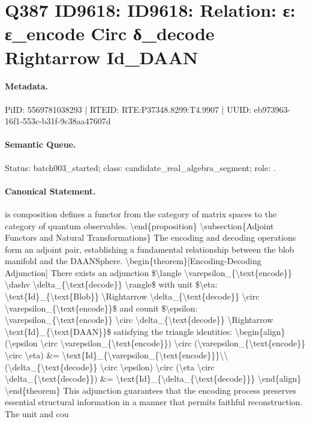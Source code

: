 \section*{Q387 ID9618: ID9618: Relation: ε: ε\_encode Circ δ\_decode Rightarrow Id\_DAAN}
\paragraph{Metadata.}
PiID: 5569781038293 | RTEID: RTE:P37348.8299:T4.9907 | UUID: eb973963-16f1-553c-b31f-9c38aa47607d

\paragraph{Semantic Queue.}
Status: batch003\_started; class: candidate\_real\_algebra\_segment; role: .

\paragraph{Canonical Statement.}
is composition defines a functor from the category of matrix spaces to the category of quantum observables. \textbackslash{}end\{proposition\} \textbackslash{}subsection\{Adjoint Functors and Natural Transformations\} The encoding and decoding operations form an adjoint pair, establishing a fundamental relationship between the blob manifold and the DAANSphere. \textbackslash{}begin\{theorem\}[Encoding-Decoding Adjunction] There exists an adjunction \$\textbackslash{}langle \textbackslash{}varepsilon\_\{\textbackslash{}text\{encode\}\} \textbackslash{}dashv \textbackslash{}delta\_\{\textbackslash{}text\{decode\}\} \textbackslash{}rangle\$ with unit \$\textbackslash{}eta: \textbackslash{}text\{Id\}\_\{\textbackslash{}text\{Blob\}\} \textbackslash{}Rightarrow \textbackslash{}delta\_\{\textbackslash{}text\{decode\}\} \textbackslash{}circ \textbackslash{}varepsilon\_\{\textbackslash{}text\{encode\}\}\$ and counit \$\textbackslash{}epsilon: \textbackslash{}varepsilon\_\{\textbackslash{}text\{encode\}\} \textbackslash{}circ \textbackslash{}delta\_\{\textbackslash{}text\{decode\}\} \textbackslash{}Rightarrow \textbackslash{}text\{Id\}\_\{\textbackslash{}text\{DAAN\}\}\$ satisfying the triangle identities: \textbackslash{}begin\{align\} (\textbackslash{}epsilon \textbackslash{}circ \textbackslash{}varepsilon\_\{\textbackslash{}text\{encode\}\}) \textbackslash{}circ (\textbackslash{}varepsilon\_\{\textbackslash{}text\{encode\}\} \textbackslash{}circ \textbackslash{}eta) \&= \textbackslash{}text\{Id\}\_\{\textbackslash{}varepsilon\_\{\textbackslash{}text\{encode\}\}\}\textbackslash{}\textbackslash{} (\textbackslash{}delta\_\{\textbackslash{}text\{decode\}\} \textbackslash{}circ \textbackslash{}epsilon) \textbackslash{}circ (\textbackslash{}eta \textbackslash{}circ \textbackslash{}delta\_\{\textbackslash{}text\{decode\}\}) \&= \textbackslash{}text\{Id\}\_\{\textbackslash{}delta\_\{\textbackslash{}text\{decode\}\}\} \textbackslash{}end\{align\} \textbackslash{}end\{theorem\} This adjunction guarantees that the encoding process preserves essential structural information in a manner that permits faithful reconstruction. The unit and cou

